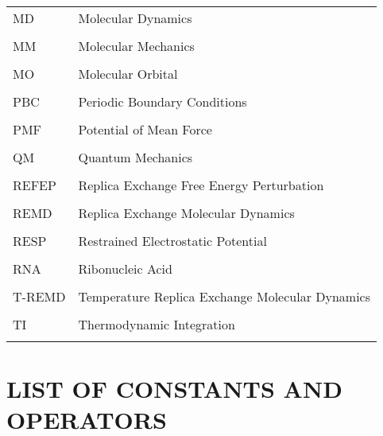 \begin{tabular}{lp{5in}}
MD & Molecular Dynamics \\ \\

MM & Molecular Mechanics \\ \\

MO & Molecular Orbital \\ \\

PBC & Periodic Boundary Conditions \\ \\

PMF & Potential of Mean Force \\ \\

QM & Quantum Mechanics \\ \\

REFEP & Replica Exchange Free Energy Perturbation \\ \\

REMD & Replica Exchange Molecular Dynamics \\ \\

RESP & Restrained Electrostatic Potential \\ \\

RNA & Ribonucleic Acid \\ \\

T-REMD & Temperature Replica Exchange Molecular Dynamics \\ \\

TI & Thermodynamic Integration \\ \\

\end{tabular}

\chapter*{LIST OF CONSTANTS AND OPERATORS}

